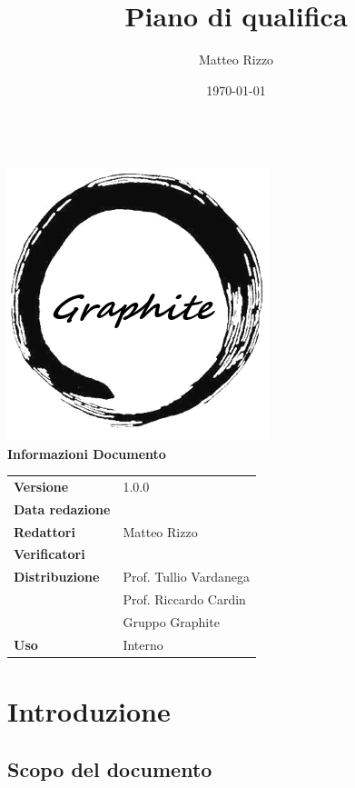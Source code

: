 \documentclass[openany,12pt,a4paper]{report}
\title{Piano di qualifica}
\author{Matteo Rizzo}
\date{\today}
\begin{document}
	\makeatletter
	\begin{titlepage}
		\setlength{\headsep}{0pt}  
		\begin{center}
			{\huge \bfseries  \@title }\\[10ex]
			\includegraphics[width=0.5\linewidth]{img/logo.png}\\[1em]
			\textbf{\Large Informazioni Documento} \\[2em]
			\bgroup
			\def\arraystretch{1.5}
			\begin{tabular}{l|l}
				\textbf{Versione} & 1.0.0 \\
				\textbf{Data redazione} & \large \@date \\
				\textbf{Redattori} &  Matteo Rizzo \\
				\textbf{Verificatori} &  \\
				\textbf{Distribuzione} & Prof. Tullio Vardanega \\
				 & Prof. Riccardo Cardin \\
				 & Gruppo Graphite \\
				\textbf{Uso} & Interno \\
			\end{tabular}
		\egroup
		\end{center}
	\end{titlepage}
	\makeatother

 
\tableofcontents{}


\chapter{Introduzione}

    \section{Scopo del documento}
    
\end{document}
